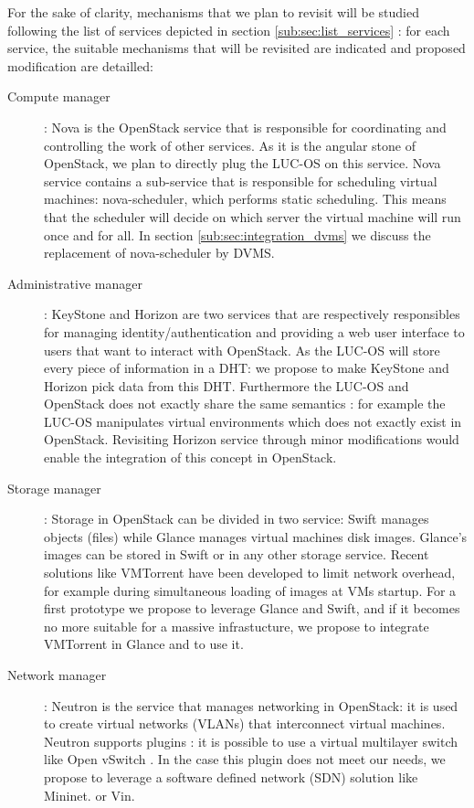 For the sake of clarity, mechanisms that we plan to revisit will be studied 
following the list of services depicted in section \ref{sub:sec:list_services} :
for each service, the suitable mechanisms that will be revisited are indicated 
and proposed modification are detailled:

\begin{description}

	\item [Compute manager] : Nova is the OpenStack service that is 
	responsible for coordinating and controlling the work of other services.
	As it is the angular stone of OpenStack, we plan to directly plug the 
	LUC-OS on this service. Nova service contains a sub-service that is
	responsible for scheduling virtual machines: nova-scheduler, which performs
	static scheduling. This means that the scheduler will decide on which
	server the virtual machine will run once and for all. In section 
	\ref{sub:sec:integration_dvms} we discuss the replacement of 
	nova-scheduler by DVMS.


	\item [Administrative manager] : KeyStone and Horizon are two services
	that are respectively responsibles for managing identity/authentication
	and providing a web user interface to users that want to interact with
	OpenStack. As the LUC-OS will store every piece of information in a DHT: we
	propose to make KeyStone and Horizon pick data from this DHT. Furthermore 
	the LUC-OS and OpenStack does not exactly share the same semantics : for
	example the LUC-OS manipulates virtual environments which does not
	exactly exist in OpenStack. Revisiting Horizon service through minor
	modifications would enable the integration of this concept in OpenStack.

	\item [Storage manager] : Storage in OpenStack can be divided in two
	service: Swift manages objects (files) while Glance manages virtual machines
	disk images. Glance's images can be stored in Swift or in any other storage
	service. Recent solutions like VMTorrent \cite{reich:2012} have been
	developed to limit network overhead, for example during simultaneous 
	loading of images at VMs startup. For a first prototype we propose to 
	leverage Glance and Swift, and if it becomes no more suitable for a
	massive infrastucture, we propose to integrate VMTorrent in Glance and 
	to use it.

	\item [Network manager] : Neutron is the service that manages networking
	in OpenStack: it is used to create virtual networks (VLANs) that
	interconnect virtual machines. Neutron supports plugins : it is possible
	to use a virtual multilayer switch like Open vSwitch \cite{pfaff:2009}.
	In the case this plugin does not meet our needs, we propose to 
	leverage a software defined network (SDN) solution like Mininet.
	\cite{lantz:2010} or Vin.

\end{description}